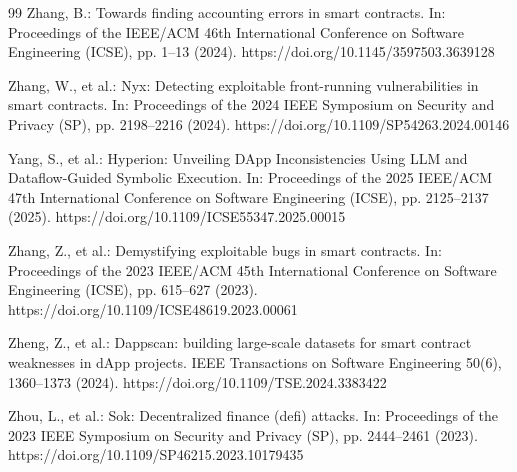 \documentclass[pdflatex,sn-basic]{sn-jnl}%
\theoremstyle{thmstyleone}%
\theoremstyle{thmstyletwo}%
\theoremstyle{thmstylethree}%
\begin{document}
\begin{thebibliography}{99}
Zhang, B.: Towards finding accounting errors in smart contracts. In: Proceedings of the IEEE/ACM 46th International Conference on Software Engineering (ICSE), pp. 1--13 (2024). https://doi.org/10.1145/3597503.3639128

Zhang, W., et al.: Nyx: Detecting exploitable front-running vulnerabilities in smart contracts. In: Proceedings of the 2024 IEEE Symposium on Security and Privacy (SP), pp. 2198--2216 (2024). https://doi.org/10.1109/SP54263.2024.00146

Yang, S., et al.: Hyperion: Unveiling DApp Inconsistencies Using LLM and Dataflow-Guided Symbolic Execution. In: Proceedings of the 2025 IEEE/ACM 47th International Conference on Software Engineering (ICSE), pp. 2125--2137 (2025). https://doi.org/10.1109/ICSE55347.2025.00015

Zhang, Z., et al.: Demystifying exploitable bugs in smart contracts. In: Proceedings of the 2023 IEEE/ACM 45th International Conference on Software Engineering (ICSE), pp. 615--627 (2023). https://doi.org/10.1109/ICSE48619.2023.00061

Zheng, Z., et al.: Dappscan: building large-scale datasets for smart contract weaknesses in dApp projects. IEEE Transactions on Software Engineering 50(6), 1360--1373 (2024). https://doi.org/10.1109/TSE.2024.3383422

Zhou, L., et al.: Sok: Decentralized finance (defi) attacks. In: Proceedings of the 2023 IEEE Symposium on Security and Privacy (SP), pp. 2444--2461 (2023). https://doi.org/10.1109/SP46215.2023.10179435

\end{thebibliography}
\end{document}
